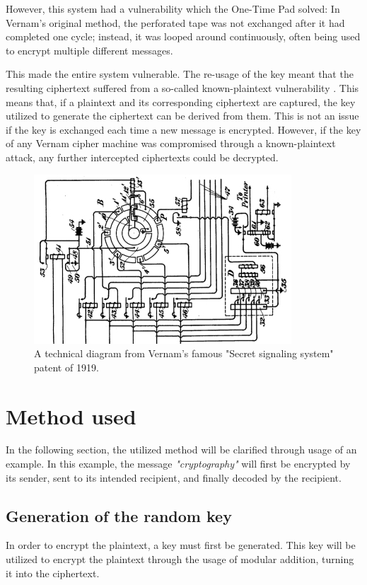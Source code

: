 \documentclass[12pt]{report}
\theoremstyle{definition}
\theoremstyle{remark}
\begin{document}
However, this system had a vulnerability which the One-Time Pad solved: In Vernam's original method, the perforated tape was not exchanged after it had completed one cycle; instead, it was looped around continuously, often being used to encrypt multiple different messages.

This made the entire system vulnerable. The re-usage of the key meant that the resulting ciphertext suffered from a so-called known-plaintext vulnerability \cite{HutSix}. This means that, if a plaintext and its corresponding ciphertext are captured, the key utilized to generate the ciphertext can be derived from them. This is not an issue if the key is exchanged each time a new message is encrypted. However, if the key of any Vernam cipher machine was compromised through a known-plaintext attack, any further intercepted ciphertexts could be decrypted.

\begin{figure}[H]
\centering
\includegraphics[scale=1]{VernamCipher.jpg}
\caption{A technical diagram from Vernam's famous "Secret signaling system" patent of 1919.}
\end{figure}    

\section{Method used}
In the following section, the utilized method will be clarified through usage of an example. In this example, the message \textit{"cryptography"} will first be encrypted by its sender, sent to its intended recipient, and finally decoded by the recipient.

\subsection{Generation of the random key}
In order to encrypt the plaintext, a key must first be generated. This key will be utilized to encrypt the plaintext through the usage of modular addition, turning it into the ciphertext.
\end{document}
